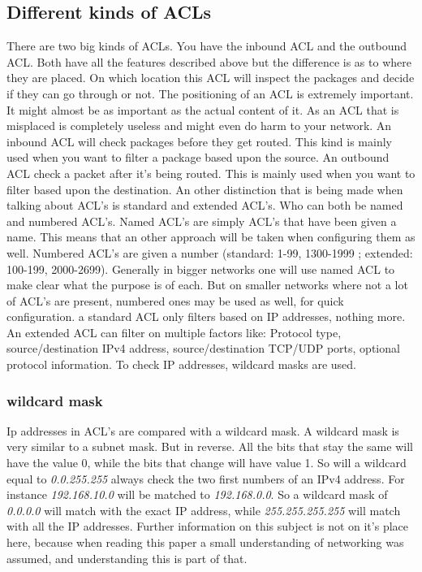  \subsection{Different kinds of ACLs}
 There are two big kinds of ACLs. You have the inbound ACL and the outbound ACL. Both have all the features described above but the difference is as to where they are placed. On which location this ACL will inspect the packages and decide if they can go through or not.
 The positioning of an ACL is extremely important. It might almost be as important as the actual content of it. As an ACL that is misplaced is completely useless and might even do harm to your network.
 An inbound ACL will check packages before they get routed. This kind is mainly used when you want to filter a package based upon the source.
 An outbound ACL check a packet after it's being routed. This is mainly used when you want to filter based upon the destination.
 An other distinction that is being made when talking about ACL's is standard and extended ACL's. Who can both be named and numbered ACL's. Named ACL's are simply ACL's that have been given a name. This means that an other approach will be taken when configuring them as well. Numbered ACL's are given a number (standard: 1-99, 1300-1999 ; extended: 100-199, 2000-2699). Generally in bigger networks one will use named ACL to make clear what the purpose is of each. But on smaller networks where not a lot of ACL's are present, numbered ones may be used as well, for quick configuration. a standard ACL only filters based on IP addresses, nothing more. An extended ACL can filter on multiple factors like: Protocol type, source/destination IPv4 address, source/destination TCP/UDP ports, optional protocol information. To check IP addresses, wildcard masks are used.
 \subsubsection{wildcard mask}
 Ip addresses in ACL's are compared with a wildcard mask. A wildcard mask is very similar to a subnet mask. But in reverse. All the bits that stay the same will have the value 0, while the bits that change will have value 1. So will a wildcard equal to \textit{0.0.255.255}  always check the two first numbers of an IPv4 address. For instance \textit{192.168.10.0} will be matched to  \textit{192.168.0.0}. So a wildcard mask of \textit{0.0.0.0} will match with the exact IP address, while \textit{255.255.255.255} will match with all the IP addresses.  Further information on this subject is not on it's place here, because when reading this paper a small understanding of networking was assumed, and understanding this is part of that.
